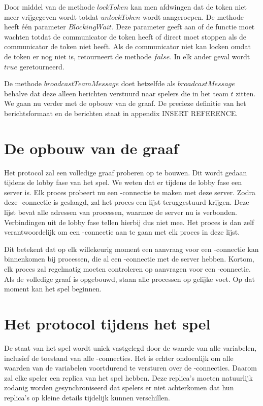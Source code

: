     Door middel van de methode $lockToken$ kan men afdwingen dat de token niet meer vrijgegeven wordt totdat $unlockToken$ wordt aangeroepen. De methode heeft \'e\'en parameter $BlockingWait$. Deze parameter geeft aan of de functie moet wachten totdat de communicator de token heeft of direct moet stoppen als de communicator de token niet heeft. Als de communicator niet kan locken omdat de token er nog niet is, retourneert de methode $false$. In elk ander geval wordt $true$ geretourneerd.

    De methode $broadcastTeamMessage$ doet hetzelfde als $broadcastMessage$ behalve dat deze alleen berichten verstuurd naar spelers die in het team $t$ zitten. We gaan nu verder met de opbouw van de graaf. De precieze definitie van het berichtsformaat en de berichten staat in appendix INSERT REFERENCE.

    \section{De opbouw van de graaf}
    Het protocol zal een volledige graaf proberen op te bouwen. Dit wordt gedaan tijdens de lobby fase van het spel. We weten dat er tijdens de lobby fase een server is. Elk proces probeert nu een \tcp-connectie te maken met deze server. Zodra deze \tcp-connectie is geslaagd, zal het proces een lijst teruggestuurd krijgen. Deze lijst bevat alle adressen van processen, waarmee de server nu is verbonden. Verbindingen uit de lobby fase tellen hierbij dus niet mee. Het proces is dan zelf verantwoordelijk om een \tcp-connectie aan te gaan met elk proces in deze lijst.

    Dit betekent dat op elk willekeurig moment een aanvraag voor een \tcp-connectie kan binnenkomen bij processen, die al een \tcp-connectie met de server hebben. Kortom, elk proces zal regelmatig moeten controleren op aanvragen voor een \tcp-connectie. Als de volledige graaf is opgebouwd, staan alle processen op gelijke voet. Op dat moment kan het spel beginnen.

    \section{Het protocol tijdens het spel}
    \label{sec:tijdensspel}
    De staat van het spel wordt uniek vastgelegd door de waarde van alle variabelen, inclusief de toestand van alle \tcp-connecties. Het is echter ondoenlijk om alle waarden van de variabelen voortdurend te versturen over de \tcp-connecties. Daarom zal elke speler een replica van het spel hebben. Deze replica's moeten natuurlijk zodanig worden gesynchroniseerd dat spelers er niet achterkomen dat hun replica's op kleine details tijdelijk kunnen verschillen.

